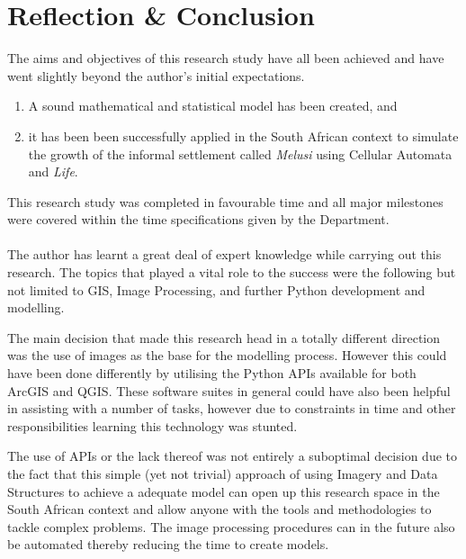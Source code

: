 \chapter{Reflection \& Conclusion} %
\label{Chapter5} %
The aims and objectives of this research study have all been achieved and have went slightly beyond the author's initial expectations.
\begin{enumerate}
\item A sound mathematical and statistical model has been created, and
\item it has been been successfully applied in the South African context to simulate the growth of the informal settlement called \textit{Melusi} using Cellular Automata and \textit{Life}.
\end{enumerate}

This research study was completed in favourable time and all major milestones were covered within the time specifications given by the Department.
\\\\
The author has learnt a great deal of expert knowledge while carrying out this research. The topics that played a vital role to the success were the following but not limited to GIS, Image Processing, and further Python development and modelling.

The main decision that made this research head in a totally different direction was the use of images as the base for the modelling process. However this could have been done differently by utilising the Python APIs available for both ArcGIS and QGIS. These software suites in general could have also been helpful in assisting with a number of tasks, however due to constraints in time and other responsibilities learning this technology was stunted. 

The use of APIs or the lack thereof was not entirely a suboptimal decision due to the fact that this simple (yet not trivial) approach of using Imagery and Data Structures to achieve a adequate model can open up this research space in the South African context and allow anyone with the tools and methodologies to tackle complex problems. The image processing procedures can in the future also be automated thereby reducing the time to create models.

